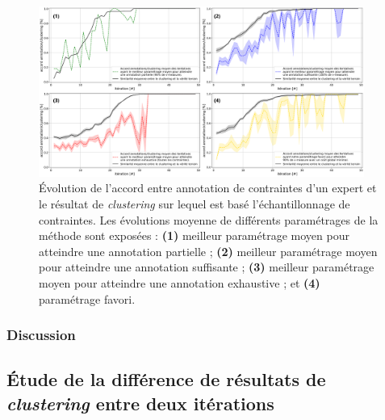 			\begin{figure}[!htb]
				\centering
				\includegraphics[width=0.95\textwidth]{figures/etude-rentabilite-accord-annotation}
				\caption{Évolution de l'accord entre annotation de contraintes d'un expert et le résultat de \textit{clustering} sur lequel est basé l'échantillonnage de contraintes.
				Les évolutions moyenne de différents paramétrages de la méthode sont exposées :
				\textbf{(1)} meilleur paramétrage moyen pour atteindre une annotation partielle ;
				\textbf{(2)} meilleur paramétrage moyen pour atteindre une annotation suffisante ;
				\textbf{(3)} meilleur paramétrage moyen pour atteindre une annotation exhaustive ;
				et \textbf{(4)} paramétrage favori.
				} 
				\label{figure:4.5.1-ETUDE-RENTABILITE-ACCORD-ANNOTATION-CLUSTERING}
			\end{figure}

		\subsubsection{Discussion}
		
			
	
	
	
	\subsection{Étude de la différence de résultats de \textit{clustering} entre deux itérations}
	\label{section:4.5.2-ETUDE-RENTABILITE-SIMILARITE-CLUSTERING}
		
	
